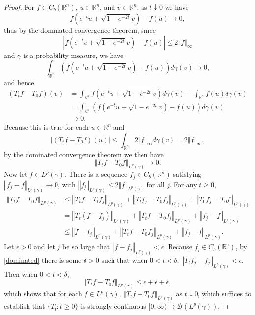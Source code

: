 \documentclass{article}
\newcommand{\norm}[1]{\left\Vert #1 \right\Vert}
\theoremstyle{definition}
\theoremstyle{definition}
\begin{document}
\begin{proof}
For $f \in C_b(\mathbb{R}^n)$, $u \in \mathbb{R}^n$, and $v \in \mathbb{R}^n$,
as $t \downarrow 0$ we have 
\[
f\left(e^{-t}u+\sqrt{1-e^{-2t}}v\right) - f(u) \to 0,
\]
thus by the dominated convergence theorem, since
\[
\left| f\left(e^{-t}u+\sqrt{1-e^{-2t}}v\right) - f(u) \right| \leq 2\norm{f}_\infty
\]
and $\gamma$ is a probability measure,
we have
\[
 \int_{\mathbb{R}^n} \left(f\left(e^{-t}u+\sqrt{1-e^{-2t}}v\right)  - f(u) \right) d\gamma(v) \to 0,
\]
and hence
\begin{align*}
(T_t f - T_0 f)(u)& = 
\int_{\mathbb{R}^n} f\left(e^{-t}u+\sqrt{1-e^{-2t}}v\right) d\gamma(v)-\int_{\mathbb{R}^n} f(u) d\gamma(v)\\
&= \int_{\mathbb{R}^n} \left(f\left(e^{-t}u+\sqrt{1-e^{-2t}}v\right)  - f(u) \right) d\gamma(v)\\
&\to 0.
\end{align*}
Because this is true for each $u \in \mathbb{R}^n$ and
\[
|(T_t f - T_0 f)(u)|  \leq \int_{\mathbb{R}^n} 2\norm{f}_\infty d\gamma(v) = 2\norm{f}_\infty,
\]
by the dominated convergence theorem we then have
\begin{equation}
\norm{T_t f -T_0 f}_{L^p(\gamma)} \to 0.
\label{dominated}
\end{equation}
Now let $f \in L^p(\gamma)$. There is a sequence $f_j \in C_b(\mathbb{R}^n)$ satisfying
$\norm{f_j-f}_{L^p(\gamma)} \to 0$, with $\norm{f_j}_{L^p(\gamma)} \leq 2 \norm{f}_{L^p(\gamma)}$ for all $j$.
For any $t \geq 0$,
\begin{align*}
\norm{T_t f - T_0 f}_{L^p(\gamma)}&\leq \norm{T_tf - T_t f_j}_{L^p(\gamma)}
+\norm{T_t f_j - T_0 f_j}_{L^p(\gamma)}
+\norm{T_0 f_j - T_0 f}_{L^p(\gamma)}\\
&= \norm{T_t (f-f_j)}_{L^p(\gamma)} + \norm{T_tf-T_0 f_j}_{L^p(\gamma)} + \norm{f_j-f}_{L^p(\gamma)}\\
&\leq  \norm{f-f_j}_{L^p(\gamma)} +  \norm{T_tf-T_0 f_j}_{L^p(\gamma)} +\norm{f_j-f}_{L^p(\gamma)}.
\end{align*}
Let $\epsilon>0$ and let $j$ be so large that $\norm{f-f_j}_{L^p(\gamma)}<\epsilon$.
Because $f_j \in C_b(\mathbb{R}^n)$, by \eqref{dominated} there is some $\delta>0$ such that 
when $0 < t < \delta$, 
$\norm{T_t f_j - f_j}_{L^p(\gamma)}<\epsilon$. Then when $0 < t < \delta$,
\[
\norm{T_t f - T_0 f}_{L^p(\gamma)} \leq \epsilon+\epsilon+\epsilon,
\]
which shows that for each $f \in L^p(\gamma)$, $\norm{T_t f - T_0f}_{L^p(\gamma)}$ as $t \downarrow 0$, which suffices
to establish that $\{T_t:t \geq 0\}$ is strongly continuous $[0,\infty) \to \mathscr{B}(L^p(\gamma))$. 
\end{proof}
\end{document}
